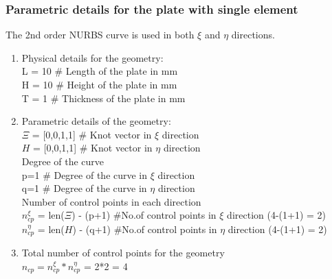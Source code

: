 \documentclass[11pt]{article}
\begin{document}
\subsubsection{Parametric details for the plate with single element}
\label{ParametricDeatils1Elem}
The 2nd order NURBS curve is used in both $\xi$ and $\eta$ directions. \\
\begin{enumerate}
	\item Physical details for the geometry: \\
	L = 10 \qquad \# Length of the plate in mm \\
	H = 10 \qquad \# Height of the plate in mm \\
	T =  1 {}  \qquad \# Thickness of the plate in mm \\
	
	\item Parametric details of the geometry: \\
	$\Xi$ = [0,0,1,1] \qquad \# Knot vector in $\xi$  direction \\
	$H$ = [0,0,1,1] \qquad \# Knot vector in $\eta$ direction \\
	
	Degree of the curve \\
	p=1 \qquad \# Degree of the curve in $\xi$  direction \\
	q=1 \qquad \# Degree of the curve in $\eta$ direction \\
	
	Number of control points in each direction \\
	$n_{cp}^{\xi}$  = len($\Xi$) - (p+1)  \qquad \#No.of control points in $\xi$
	direction (4-(1+1) = 2) \\
	$n_{cp}^{\eta}$ = len($H$) - (q+1)  \qquad \#No.of control points in $\eta$
	direction (4-(1+1) = 2) \\
	
	\item Total number of control points for the geometry \\
	$n_{cp} = n_{cp}^{\xi} * n_{cp}^{\eta}$ = 2*2 = 4\\

\end{enumerate}
\end{document}
